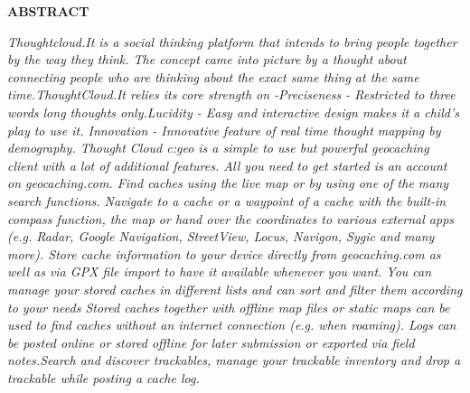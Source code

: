 
\begin{center}
\thispagestyle{empty}
\vspace*{4\baselineskip}
\LARGE{\textbf{ABSTRACT}}\\[1.0cm]
\end{center}
\thispagestyle{empty}
\large{\emph{Thoughtcloud.It  is a social thinking platform that intends to bring people together by the way they think. The concept came into picture by a thought about connecting people who are thinking about the exact same thing at the same time.ThoughtCloud.It relies its core strength on -Preciseness - Restricted to three words long thoughts only.Lucidity - Easy and interactive design makes it a child's play to use it. Innovation - Innovative feature of real time thought mapping by demography. Thought Cloud c:geo is a simple to use but powerful geocaching client with a lot of additional features. All you need to get started is an account on geocaching.com. Find caches using the live map or by using one of the many search functions. Navigate to a cache or a waypoint of a cache with the built-in compass function, the map or hand over the coordinates to various external apps (e.g. Radar, Google Navigation, StreetView, Locus, Navigon, Sygic and many more).
Store cache information to your device directly from geocaching.com as well as via GPX file import to have it available whenever you want. You can manage your stored caches in different lists and can sort and filter them according to your needs Stored caches together with offline map files or static maps can be used to find caches without an internet connection (e.g. when roaming).
Logs can be posted online or stored offline for later submission or exported via field notes.Search and discover trackables, manage your trackable inventory and drop a trackable while posting a cache log.\\[1cm]}}


